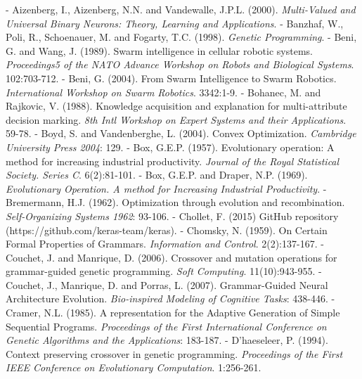 \documentclass[spanish,a4paper,12pt,twoside]{report}
\begin{document}
  \begin{thebibliography}{00}
  \vspace{-1cm}
  \makeatletter
  \def\@biblabel#1{}
  \let\old@bibitem\bibitem
  \def\bibitem#1{\old@bibitem{#1}\leavevmode\kern-\bibindent}
  \makeatother
  
   Aizenberg, I., Aizenberg, N.N. and Vandewalle, J.P.L. (2000). \emph{Multi-Valued and Universal Binary Neurons: Theory, Learning and Applications}.
   Banzhaf, W., Poli, R., Schoenauer, M. and Fogarty, T.C. (1998). \emph{Genetic Programming}.
   Beni, G. and Wang, J. (1989). Swarm intelligence in cellular robotic systems. \emph{Proceedings5 of the NATO Advance Workshop on Robots and Biological Systems}. 102:703-712.
   Beni, G. (2004). From Swarm Intelligence to Swarm Robotics. \emph{International Workshop on Swarm Robotics}. 3342:1-9.
   Bohanec, M. and Rajkovic, V. (1988). Knowledge acquisition and explanation for multi-attribute decision marking. \emph{8th Intl Workshop on Expert Systems and their Applications}. 59-78.
   Boyd, S. and Vandenberghe, L. (2004). Convex Optimization. \emph{Cambridge University Press 2004}: 129.
   Box, G.E.P. (1957). Evolutionary operation: A method for increasing industrial productivity. \emph{Journal of the Royal Statistical Society. Series C}. 6(2):81-101.
   Box, G.E.P. and Draper, N.P. (1969). \emph{Evolutionary Operation. A method for Increasing Industrial Productivity}.
   Bremermann, H.J. (1962). Optimization through evolution and recombination. \emph{Self-Organizing Systems 1962}: 93-106.
   Chollet, F. (2015) GitHub repository (https://github.com/keras-team/keras).
   Chomsky, N. (1959). On Certain Formal Properties of Grammars. \emph{Information and Control}. 2(2):137-167.
   Couchet, J. and Manrique, D. (2006). Crossover and mutation operations for grammar-guided genetic programming. \emph{Soft Computing}. 11(10):943-955.
   Couchet, J., Manrique, D. and Porras, L. (2007). Grammar-Guided Neural Architecture Evolution. \emph{Bio-inspired Modeling of Cognitive Tasks}: 438-446.
   Cramer, N.L. (1985). A representation for the Adaptive Generation of Simple Sequential Programs. \emph{Proceedings of the First International Conference on Genetic Algorithms and the Applications}: 183-187.
   D'haeseleer, P. (1994). Context preserving crossover in genetic programming. \emph{Proceedings of the First IEEE Conference on Evolutionary Computation}. 1:256-261.

\end{thebibliography}
\end{document}
